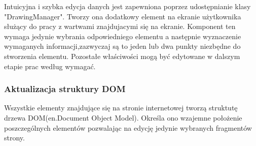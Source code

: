 Intuicyjna i szybka edycja danych jest zapewniona poprzez udostępnianie klasy "DrawingManager". Tworzy ona dodatkowy element na ekranie użytkownika służący do pracy z wartwami znajdujacymi się na ekranie. Komponent ten wymaga jedynie wybrania odpowiedniego elementu a następnie wyznaczenie wymaganych informacji,zazwyczaj są to jeden lub dwa punkty niezbędne do stworzenia elementu. Pozostałe właściwości mogą być edytowane w dalszym etapie prac według wymagać.

\subsubsection{Aktualizacja struktury DOM}
\label{subsubsec:dom}

Wszystkie elementy znajdujące się na stronie internetowej tworzą struktutę drzewa DOM(en.Document Object Model). Określa ono wzajemne położenie poszczególnych elementów pozwalając na edycję jedynie wybranych fragmentów strony. 
